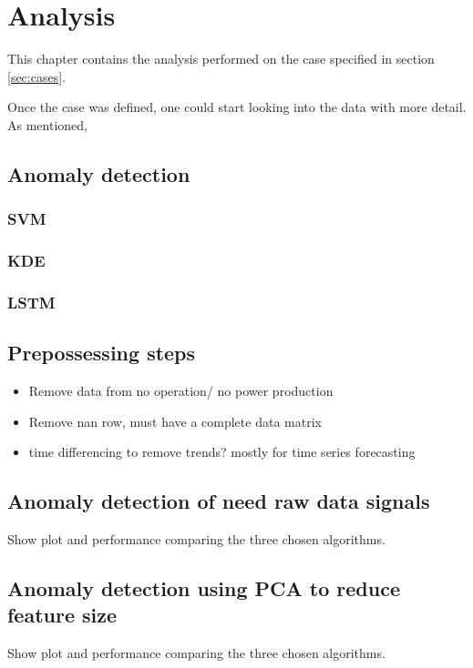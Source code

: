 \chapter{Analysis}\label{cha:analysis}
This chapter contains the analysis performed on the case specified in section \ref{sec:cases}. 


    Once the case was defined, one could start looking into the data with more detail. As mentioned, 
    
    
    \section{Anomaly detection}
        \subsection{SVM}
        
        \subsection{KDE}
        
        \subsection{LSTM}
        
    \section{Prepossessing steps}
        \begin{itemize}
            \item Remove data from no operation/ no power production
            \item Remove nan row, must have a complete data matrix 
            \item time differencing to remove trends? mostly for time series forecasting
        \end{itemize}
    \section{Anomaly detection of need raw data signals}
        Show plot and performance comparing the three chosen algorithms. 
    
    \section{Anomaly detection using PCA to reduce feature size}
        Show plot and performance comparing the three chosen algorithms. 
    

